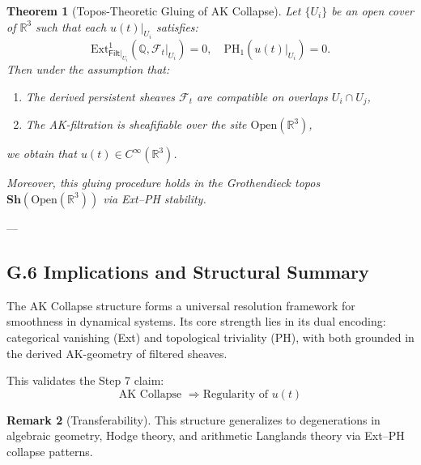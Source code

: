 \documentclass[11pt]{article}
\newtheorem{theorem}{Theorem}[section]
\theoremstyle{definition}
\newtheorem{remark}[theorem]{Remark}
\begin{document}
\begin{theorem}[Topos-Theoretic Gluing of AK Collapse]
Let $\{ U_i \}$ be an open cover of \( \mathbb{R}^3 \) such that each \( u(t)|_{U_i} \) satisfies:
\[
\mathrm{Ext}^1_{\mathsf{Filt}|_{U_i}}(\mathbb{Q}, \mathcal{F}_t|_{U_i}) = 0, \quad \mathrm{PH}_1(u(t)|_{U_i}) = 0.
\]
Then under the assumption that:
\begin{enumerate}
  \item The derived persistent sheaves \( \mathcal{F}_t \) are compatible on overlaps \( U_i \cap U_j \),
  \item The AK-filtration is sheafifiable over the site \( \mathrm{Open}(\mathbb{R}^3) \),
\end{enumerate}
we obtain that \( u(t) \in C^\infty(\mathbb{R}^3) \).

Moreover, this gluing procedure holds in the Grothendieck topos \( \mathbf{Sh}(\mathrm{Open}(\mathbb{R}^3)) \) via Ext–PH stability.
\end{theorem}

---

\subsection*{G.6 Implications and Structural Summary}

The AK Collapse structure forms a universal resolution framework for smoothness in dynamical systems.  
Its core strength lies in its dual encoding: categorical vanishing (Ext) and topological triviality (PH),  
with both grounded in the derived AK-geometry of filtered sheaves.

This validates the Step 7 claim:
\[
\text{AK Collapse } \Longrightarrow \text{Regularity of } u(t)
\]

\begin{remark}[Transferability]
This structure generalizes to degenerations in algebraic geometry, Hodge theory, and arithmetic Langlands theory via Ext–PH collapse patterns.
\end{remark}
\end{document}
